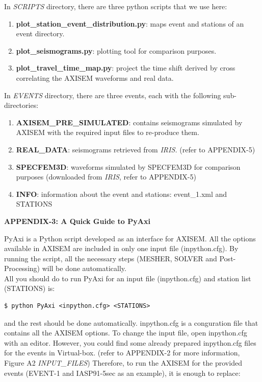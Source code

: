 \documentclass{article}
\begin{document}
In \textit{SCRIPTS} directory, there are three python scripts that we use here:

\begin{enumerate}
 \item \textbf{plot\_station\_event\_distribution.py}: maps event and stations of an event directory.
 \item \textbf{plot\_seismograms.py}: plotting tool for comparison purposes.
 \item \textbf{plot\_travel\_time\_map.py}: project the time shift derived by cross correlating the AXISEM waveforms and real data.
\end{enumerate}

In \textit{EVENTS} directory, there are three events, each with the following sub-directories:

\begin{enumerate}
 \item \textbf{AXISEM\_PRE\_SIMULATED}: contains seismograms simulated by AXISEM with 
the required input files to re-produce them.
 \item \textbf{REAL\_DATA}: seismograms retrieved from \textit{IRIS. }(refer to APPENDIX-5)
 \item \textbf{SPECFEM3D}: waveforms simulated by SPECFEM3D for comparison purposes 
(downloaded from\textit{ IRIS}, refer to APPENDIX-5)
 \item \textbf{INFO}: information about the event and stations: event\_1.xml and STATIONS
\end{enumerate}


\newpage
{\large{}\textbf{APPENDIX-3: A Quick Guide to PyAxi}}

PyAxi is a Python script developed as an interface for AXISEM. All the options 
available in AXISEM are included in only one input file (inpython.cfg). By running 
the script, all the necessary steps (MESHER, SOLVER and Post-Processing) will be 
done automatically. \\

All you should do to run PyAxi for an input file (inpython.cfg) and station list 
(STATIONS) is:
\begin{lstlisting}
$ python PyAxi <inpython.cfg> <STATIONS>
\end{lstlisting}

and the rest should be done automatically. inpython.cfg is a conguration file that 
contains all the AXISEM options. To change the input file, open inpython.cfg with 
an editor. However, you could find some already prepared inpython.cfg files for 
the events in Virtual-box. (refer to APPENDIX-2 for more information, Figure A2 
\textit{INPUT\_FILES}) Therefore, to run the AXISEM for the provided events (EVENT-1 
and IASP91-5sec as an example), it is enough to replace:
\end{document}
